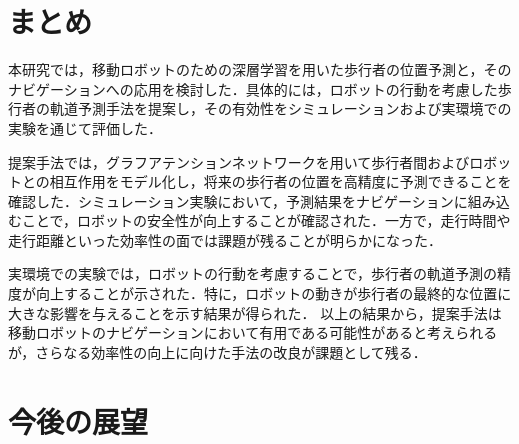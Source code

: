 
\section{まとめ}
本研究では，移動ロボットのための深層学習を用いた歩行者の位置予測と，そのナビゲーションへの応用を検討した．具体的には，ロボットの行動を考慮した歩行者の軌道予測手法を提案し，その有効性をシミュレーションおよび実環境での実験を通じて評価した．

提案手法では，グラフアテンションネットワークを用いて歩行者間およびロボットとの相互作用をモデル化し，将来の歩行者の位置を高精度に予測できることを確認した．シミュレーション実験において，予測結果をナビゲーションに組み込むことで，ロボットの安全性が向上することが確認された．一方で，走行時間や走行距離といった効率性の面では課題が残ることが明らかになった．

実環境での実験では，ロボットの行動を考慮することで，歩行者の軌道予測の精度が向上することが示された．特に，ロボットの動きが歩行者の最終的な位置に大きな影響を与えることを示す結果が得られた．
以上の結果から，提案手法は移動ロボットのナビゲーションにおいて有用である可能性があると考えられるが，さらなる効率性の向上に向けた手法の改良が課題として残る．

\section{今後の展望}

\newpage